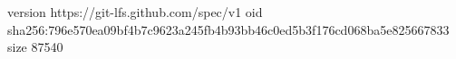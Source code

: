 version https://git-lfs.github.com/spec/v1
oid sha256:796e570ea09bf4b7c9623a245fb4b93bb46c0ed5b3f176cd068ba5e825667833
size 87540
